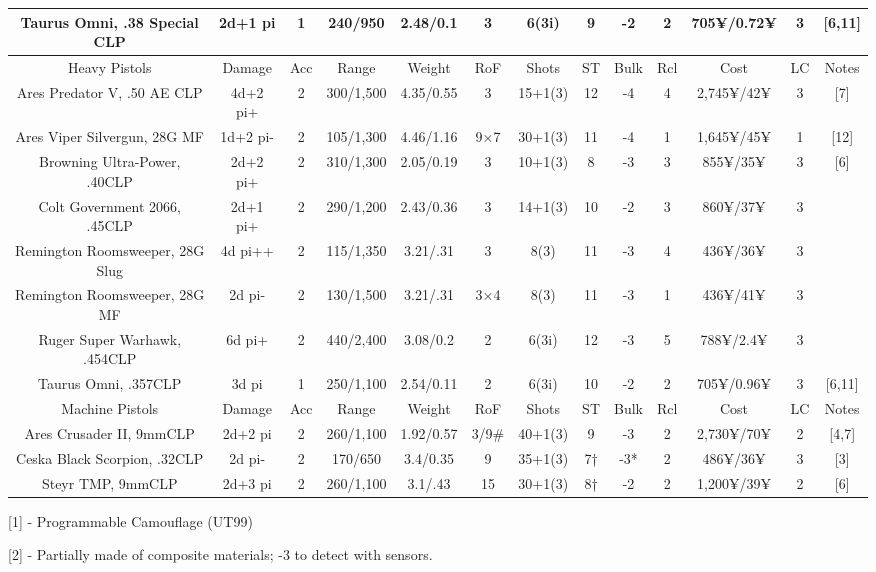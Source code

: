 \begin{center}
\begin{adjustwidth}{-10.3mm}{}
{\begin{tabular}{|c|c|c|c|c|c|c|c|c|c|c|c|c|}
				Taurus Omni, .38 Special CLP & 2d+1 pi & 1 & 240/950 & 2.48/0.1 & 3 & 6(3i) & 9 & -2 & 2 & 705¥/0.72¥ & 3 & [6,11] \\
				\hline
				Heavy Pistols & Damage & Acc & Range & Weight & RoF & Shots & ST & Bulk & Rcl & Cost & LC & Notes\\
				\hline
				Ares Predator V, .50 AE CLP & 4d+2 pi+ & 2 & 300/1,500 & 4.35/0.55 & 3 & 15+1(3) & 12 & -4 & 4 & 2,745¥/42¥ & 3 & [7]\\
				Ares Viper Silvergun, 28G MF & 1d+2 pi- & 2 & 105/1,300 & 4.46/1.16 & 9×7 & 30+1(3) & 11 & -4 & 1 & 1,645¥/45¥ & 1 & [12] \\
				Browning Ultra-Power, .40CLP & 2d+2 pi+ & 2 & 310/1,300 & 2.05/0.19 & 3 & 10+1(3) & 8 & -3 & 3 & 855¥/35¥ & 3 & [6] \\
				Colt Government 2066, .45CLP & 2d+1 pi+ & 2 & 290/1,200 & 2.43/0.36 & 3 & 14+1(3) & 10 & -2 & 3 & 860¥/37¥ & 3  &\\
				Remington Roomsweeper, 28G Slug & 4d pi++ & 2 & 115/1,350 & 3.21/.31 & 3 & 8(3) & 11 & -3 & 4 & 436¥/36¥ & 3  & \\
				Remington Roomsweeper, 28G MF & 2d pi- & 2 & 130/1,500 & 3.21/.31 & 3×4 & 8(3) & 11 & -3 & 1 & 436¥/41¥ & 3 &	\\
				Ruger Super Warhawk, .454CLP & 6d pi+ & 2 & 440/2,400 & 3.08/0.2 & 2 & 6(3i) & 12 & -3 & 5 & 788¥/2.4¥ & 3 	&\\
				Taurus Omni, .357CLP  & 3d pi & 1 & 250/1,100 & 2.54/0.11 & 2 & 6(3i) & 10 & -2 & 2 & 705¥/0.96¥ & 3 & [6,11]\\
				\hline
				Machine Pistols & Damage & Acc & Range & Weight & RoF & Shots & ST & Bulk & Rcl & Cost & LC & Notes\\
				\hline
				Ares Crusader II, 9mmCLP & 2d+2 pi & 2 & 260/1,100 & 1.92/0.57 & 3/9\# & 40+1(3) & 9 & -3 & 2 & 2,730¥/70¥ & 2 & [4,7] \\
				Ceska Black Scorpion, .32CLP & 2d pi- & 2 & 170/650 & 3.4/0.35 & 9 & 35+1(3) & 7† & -3* & 2 & 486¥/36¥ & 3 & [3] \\
				Steyr TMP, 9mmCLP & 2d+3 pi & 2 & 260/1,100 & 3.1/.43 & 15 & 30+1(3) & 8† & -2 & 2 & 1,200¥/39¥ & 2 & [6] \\
				\hline
			\end{tabular}
		}
	\end{adjustwidth}
\end{center}

[1] - Programmable Camouflage (UT99)

[2] - Partially made of composite materials; -3 to detect with sensors.

